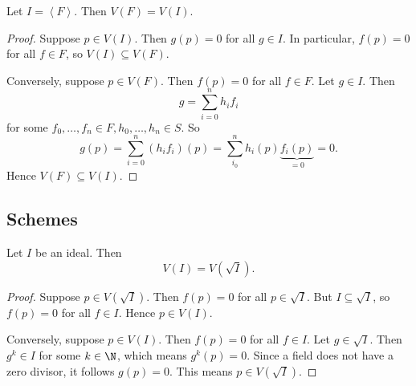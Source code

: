 \documentclass[co439]{subfiles}
\begin{document}
    \rruleline

    \clearpage
    
    \begin{lemma}{}
        Let $I = \left< F \right>$. Then $V\left( F \right) = V\left( I \right)$. 
    \end{lemma}

    \begin{proof}
        Suppose $p\in V\left( I \right)$. Then $g\left( p \right) = 0$ for all $g\in I$. In particular, $f\left( p \right)=0$ for all $f\in F$, so $V\left( I \right)\subseteq V\left( F \right)$.

        Conversely, suppose $p\in V\left( F \right)$. Then $f\left( p \right) = 0$ for all $f\in F$. Let $g\in I$. Then
        \begin{equation*}
            g = \sum^{n}_{i=0} h_if_i
        \end{equation*}
        for some $f_0,\ldots,f_n\in F, h_0,\ldots,h_n\in S$. So
        \begin{equation*}
            g\left( p \right) = \sum^{n}_{i=0} \left( h_if_i \right)\left( p \right) = \sum^{n}_{i_0} h_i\left( p \right)\underbrace{f_i\left( p \right)}_{=0} = 0.
        \end{equation*}
        Hence $V\left( F \right)\subseteq V\left( I \right)$.
    \end{proof}
    
    \subsection{Schemes}

    \begin{lemma}{}
        Let $I$ be an ideal. Then
        \begin{equation*}
            V\left( I \right) = V\left( \sqrt{I} \right).
        \end{equation*}
    \end{lemma}
    
    \begin{proof}
        Suppose $p\in V\left( \sqrt{I} \right)$. Then $f\left( p \right) = 0$ for all $p\in \sqrt{I}$. But $I\subseteq\sqrt{I}$, so $f\left( p \right) = 0$ for all $f\in I$. Hence $p\in V\left( I \right)$.

        Conversely, suppose $p\in V\left( I \right)$. Then $f\left( p \right) = 0$ for all $f\in I$. Let $g\in \sqrt{I}$. Then $g^k\in I$ for some $k\in\N$, which means $g^k\left( p \right) = 0$. Since a field does not have a zero divisor, it follows $g\left( p \right) = 0$. This means $p\in V\left( \sqrt{I} \right)$.
    \end{proof}
\end{document}
